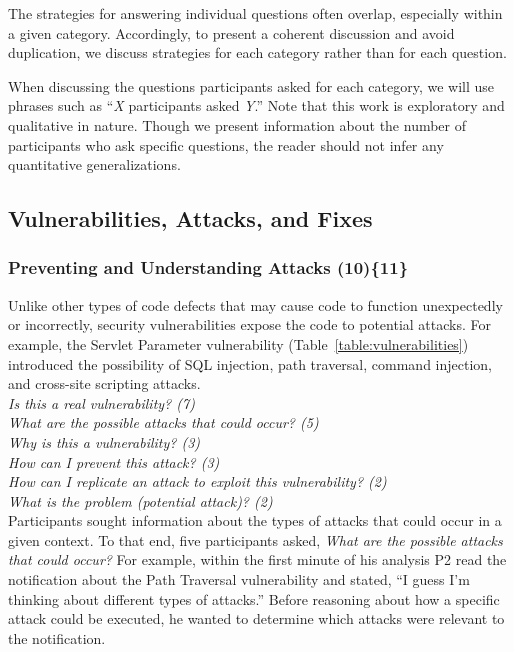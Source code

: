 \documentclass[10pt,journal,compsoc]{IEEEtran}
\begin{document}
The strategies for answering individual questions often overlap, especially within a given category.
Accordingly, to present a coherent discussion and avoid duplication, we discuss strategies for each category rather than for each question.


When discussing the questions participants asked for each category, we will use phrases such as ``\emph{X} participants asked \emph{Y}.''
Note that this work is exploratory and qualitative in nature.
Though we present information about the number of participants who ask specific questions, the reader should not infer any quantitative generalizations.

\subsection{Vulnerabilities, Attacks, and Fixes}
\label{sec:results-vaf}

\subsubsection{Preventing and Understanding Attacks (10)\{11\}}
\label{pupa}
Unlike other types of code defects that may cause code to function unexpectedly or incorrectly, security vulnerabilities expose the code to potential attacks. For example, the Servlet Parameter vulnerability (Table~\ref{table:vulnerabilities}) introduced the possibility of SQL injection, path traversal, command injection, and cross-site scripting attacks.
\\

\noindent\emph{Is this a real vulnerability? (7)} \\
\emph{What are the possible attacks that could occur? (5)} \\
\emph{Why is this a vulnerability? (3)} \\
\emph{How can I prevent this attack? (3)} \\
\emph{How can I replicate an attack to exploit this vulnerability? (2)} \\
\emph{What is the problem (potential attack)? (2)} 
\\

Participants sought information about the types of attacks that could occur in a given context.
To that end, five participants asked, \textit{What are the possible attacks that could occur?}
For example, within the first minute of his analysis P2 read the notification about the Path Traversal vulnerability and stated, ``I guess I'm thinking about different types of attacks.''
Before reasoning about how a specific attack could be executed, he wanted to determine which attacks were relevant to the notification.
\end{document}
